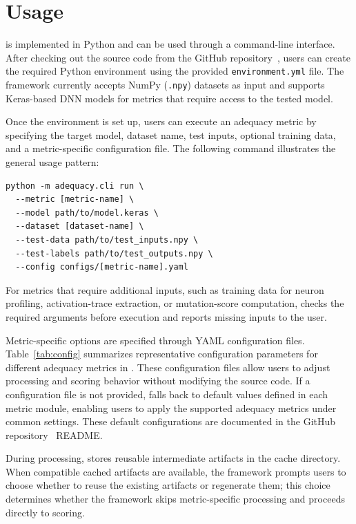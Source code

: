 \section{\tool Usage}
\tool is implemented in Python and can be used through a command-line interface.
After checking out the source code from the GitHub repository~\cite{adept}, users can create the required Python environment using the provided \texttt{environment.yml} file.
The framework currently accepts NumPy (\texttt{.npy}) datasets as input and supports Keras-based DNN models for metrics that require access to the tested model.

Once the environment is set up, users can execute an adequacy metric by specifying the target model, dataset name, test inputs, optional training data, and a metric-specific configuration file.
The following command illustrates the general usage pattern:
\begin{small}
\begin{verbatim}
python -m adequacy.cli run \
  --metric [metric-name] \
  --model path/to/model.keras \
  --dataset [dataset-name] \
  --test-data path/to/test_inputs.npy \
  --test-labels path/to/test_outputs.npy \
  --config configs/[metric-name].yaml
\end{verbatim}
\end{small}
For metrics that require additional inputs, such as training data for neuron profiling, activation-trace extraction, or mutation-score computation, \tool checks the required arguments before execution and reports missing inputs to the user.


Metric-specific options are specified through YAML configuration files.
Table~\ref{tab:config} summarizes representative configuration parameters for different adequacy metrics in \tool.
These configuration files allow users to adjust processing and scoring behavior without modifying the source code.
If a configuration file is not provided, \tool falls back to default values defined in each metric module, enabling users to apply the supported adequacy metrics under common settings. These default configurations are documented in the GitHub repository~\cite{adept} README.

During processing, \tool stores reusable intermediate artifacts in the cache directory.
When compatible cached artifacts are available, the framework prompts users to choose whether to reuse the existing artifacts or regenerate them; this choice determines whether the framework skips metric-specific processing and proceeds directly to scoring.

